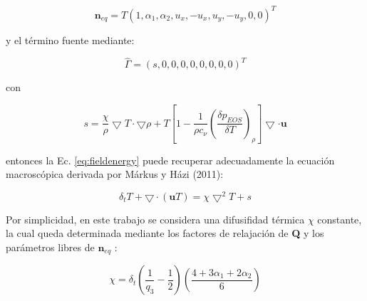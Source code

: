 \begin{equation}
    {\mathbf{n}}_{eq} = T { \left( 1, \alpha_{1}, \alpha_{2}, u_{x}, -u_{x}, u_{y}, -u_{y}, 0, 0 \right) }^{T}
\end{equation}

y el término fuente mediante:

\begin{equation}
    \hat{\Gamma} = {( s, 0, 0, 0, 0, 0, 0, 0, 0 )}^{T}
\end{equation}

con 

\begin{equation}
    s = \frac{\chi}{\rho} \bigtriangledown T \cdot \bigtriangledown \rho + T \left[ 1 - \frac{1}{\rho c_{\nu}} {\left( \frac{\delta p_{EOS}}{\delta T} \right)}_{\rho} \right] \bigtriangledown \cdot \mathbf{u}
\end{equation}

entonces la Ec. \ref{eq:fieldenergy} puede recuperar adecuadamente la ecuación macroscópica derivada por
Márkus y Házi (2011):

\begin{equation}
    \delta_{t} T + \bigtriangledown \cdot ( \mathbf{u} T ) = \chi {\bigtriangledown }^{2} T + s
\end{equation}

Por simplicidad, en este trabajo se considera una difusifidad térmica $\chi$ constante, la cual
queda determinada mediante los factores de relajación de \textbf{Q} y los parámetros libres de ${\textbf{n}}_{eq}$ :

\begin{equation}
    \chi = \delta_{t} \left( \frac{1}{q_{3}} - \frac{1}{2} \right) \left( \frac{ 4 + 3 \alpha_{1} + 2 \alpha_{2}}{6} \right)
\end{equation}




